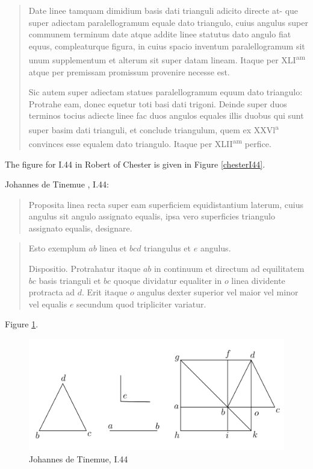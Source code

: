 \documentclass{article}
\begin{document}
\begin{quote}
Date linee tamquam dimidium basis dati trianguli adicito directe at- que super adiectam paralellogramum equale dato triangulo, cuius angulus super communem terminum date atque addite linee statutus dato angulo fiat equus, compleaturque figura, in cuius spacio inventum paralellogramum sit unum supplementum et alterum sit super datam lineam. Itaque per XLI\textsuperscript{am} atque per premissam promissum provenire necesse est.

Sic autem super adiectam statues paralellogramum equum dato triangulo: Protrahe eam, donec equetur toti basi dati trigoni. Deinde super duos terminos tocius adiecte linee fac duos angulos equales illis duobus qui sunt super basim dati trianguli, et conclude triangulum, quem ex XXVl\textsuperscript{a} convinces esse equalem dato triangulo. Itaque per XLII\textsuperscript{am} perfice.
\end{quote}

The figure for I.44 in Robert of Chester is given in Figure \ref{chesterI44}.

Johannes de Tinemue \cite[pp.~67--68]{adelardIII}, I.44:

\begin{quote}
Proposita linea recta super eam superficiem equidistantium laterum, 
cuius angulus sit angulo assignato equalis, ipsa vero superficies triangulo
assignato equalis, designare.
\end{quote}

\begin{quote}
Esto exemplum $ab$ linea et $bcd$ triangulus et $e$ angulus.

Dispositio. Protrahatur itaque $ab$ in continuum et directum ad equilitatem
$bc$ basis trianguli et $bc$ quoque dividatur equaliter in $o$ linea dividente
protracta ad $d$. Erit itaque $o$ angulus dexter superior vel maior vel minor
vel equalis $e$ secundum quod tripliciter variatur.
\end{quote}

Figure \ref{tinemueI44a}.

\begin{figure}
\begin{center}
\includegraphics{tinemueI44a.png}
\end{center}
\caption{Johannes de Tinemue, I.44}
\label{tinemueI44a}
\end{figure}
\end{document}
